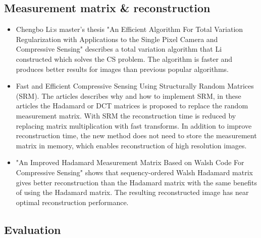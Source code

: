 \subsection{Measurement matrix \& reconstruction}

\begin{itemize}
    
\item \cite{article:TVAL3} Chengbo Li:s master's thesis "An Efficient Algorithm For Total Variation Regularization with Applications to the Single Pixel Camera and Compressive Sensing" describes a total variation algorithm that Li constructed which solves the CS problem. The algorithm is faster and produces better results for images than previous popular algorithms.   

\item \cite{article:SRM_short, article:SRM_long, article:SRM_block} Fast and Efficient Compressive Sensing Using Structurally Random Matrices (SRM). The articles describes why and how to implement SRM, in these articles the Hadamard or DCT matrices is proposed to replace the random measurement matrix. With SRM the reconstruction time is reduced by replacing matrix multiplication with fast transforms. In addition to improve reconstruction time, the new method does not need to store the measurement matrix in memory, which enables reconstruction of high resolution images. 

\item \cite{article:an_improved_WH_matrix} "An Improved Hadamard Measurement Matrix Based on Walsh Code For Compressive Sensing" shows that sequency-ordered Walsh Hadamard matrix gives better reconstruction than the Hadamard matrix with the same benefits of using the Hadamard matrix. The resulting reconstructed image has near optimal reconstruction performance.
	

\end{itemize}


\subsection{Evaluation}

